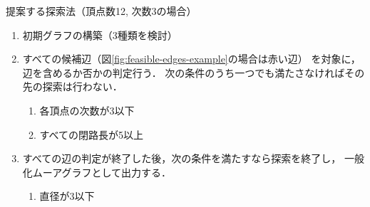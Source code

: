 \begin{frame}{提案する探索法（頂点数12, 次数3の場合）}
\begin{enumerate}
\item 初期グラフの構築（3種類を検討）
\item すべての候補辺（図\ref{fig:feasible-edges-example}の場合は赤い辺）
  を対象に，辺を含めるか否かの判定行う．
  次の条件のうち一つでも満たさなければその先の探索は行わない．
\begin{enumerate}
\item 各頂点の次数が3以下
\item すべての閉路長が5以上
\end{enumerate}
\item すべての辺の判定が終了した後，次の条件を満たすなら探索を終了し，
  一般化ムーアグラフとして出力する．
  \begin{enumerate}
    \item 直径が3以下
  \end{enumerate}
\end{enumerate}
\begin{columns}[b]
\begin{column}{.32\textwidth}
\centering
      \def\svgwidth{\textwidth}
      
      \label{fig:feasible-edges-example}
\end{column}
\begin{column}{.32\textwidth}
\centering
        \def\svgwidth{\textwidth}
        
        \label{fig:initial-graph-cycle}
\end{column}
\begin{column}{.32\textwidth}
\centering
        \def\svgwidth{\textwidth}
        
        \label{fig:initial-graph-stree}
\end{column}
\end{columns}
\end{frame}

